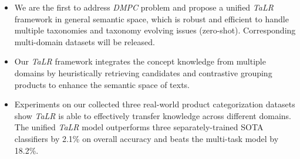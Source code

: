 \begin{itemize}
    \item We are the first to address \textit{DMPC} problem and propose a unified \textit{TaLR} framework in general semantic space, which is robust and efficient to handle multiple taxonomies and taxonomy evolving issues (zero-shot). Corresponding multi-domain datasets will be released.
    \item Our \textit{TaLR} framework integrates the concept knowledge from multiple domains by heuristically retrieving candidates and contrastive grouping products to enhance the semantic space of texts.

    \item Experiments on our collected three real-world product categorization datasets show
    \textit{TaLR} is able to effectively transfer knowledge across different domains. The unified \textit{TaLR} model outperforms three separately-trained SOTA classifiers by 2.1\% on overall accuracy and beats the multi-task model by 18.2\%. 
\end{itemize}